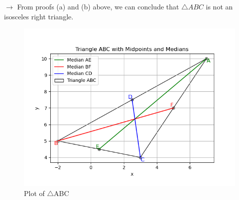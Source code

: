 \documentclass[journal]{IEEEtran}
\begin{document}
$\longrightarrow$ From proofs (a) and (b) above, we can conclude that $\triangle ABC$ is not an isosceles right triangle.
\begin{figure}[h!]
   \centering
   \includegraphics[width=\linewidth]{figs/01.png}
   \caption{Plot of $\triangle$ABC}
   \label{Plot_1}
\end{figure}
\end{document}
